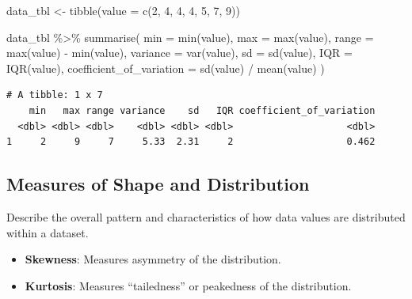 \documentclass[
  man,
  floatsintext,
  longtable,
  nolmodern,
  notxfonts,
  notimes,
  colorlinks=true,linkcolor=blue,citecolor=blue,urlcolor=blue]{apa7}
\newenvironment{Shaded}{\begin{snugshade}}{\end{snugshade}}
\newcommand{\AttributeTok}[1]{\textcolor[rgb]{0.40,0.45,0.13}{#1}}
\newcommand{\DecValTok}[1]{\textcolor[rgb]{0.68,0.00,0.00}{#1}}
\newcommand{\FunctionTok}[1]{\textcolor[rgb]{0.28,0.35,0.67}{#1}}
\newcommand{\NormalTok}[1]{\textcolor[rgb]{0.00,0.23,0.31}{#1}}
\newcommand{\OtherTok}[1]{\textcolor[rgb]{0.00,0.23,0.31}{#1}}
\newcommand{\SpecialCharTok}[1]{\textcolor[rgb]{0.37,0.37,0.37}{#1}}
\providecommand{\tightlist}{%
  \setlength{\itemsep}{0pt}\setlength{\parskip}{0pt}}
\begin{document}
\begin{Shaded}
\begin{Highlighting}[]
\NormalTok{data\_tbl }\OtherTok{\textless{}{-}} \FunctionTok{tibble}\NormalTok{(}\AttributeTok{value =} \FunctionTok{c}\NormalTok{(}\DecValTok{2}\NormalTok{, }\DecValTok{4}\NormalTok{, }\DecValTok{4}\NormalTok{, }\DecValTok{4}\NormalTok{, }\DecValTok{5}\NormalTok{, }\DecValTok{7}\NormalTok{, }\DecValTok{9}\NormalTok{))}

\NormalTok{data\_tbl }\SpecialCharTok{\%\textgreater{}\%}
  \FunctionTok{summarise}\NormalTok{(}
    \AttributeTok{min =} \FunctionTok{min}\NormalTok{(value),}
    \AttributeTok{max =} \FunctionTok{max}\NormalTok{(value),}
    \AttributeTok{range =} \FunctionTok{max}\NormalTok{(value) }\SpecialCharTok{{-}} \FunctionTok{min}\NormalTok{(value),}
    \AttributeTok{variance =} \FunctionTok{var}\NormalTok{(value),}
    \AttributeTok{sd =} \FunctionTok{sd}\NormalTok{(value),}
    \AttributeTok{IQR =} \FunctionTok{IQR}\NormalTok{(value),}
    \AttributeTok{coefficient\_of\_variation =} \FunctionTok{sd}\NormalTok{(value) }\SpecialCharTok{/} \FunctionTok{mean}\NormalTok{(value)}
\NormalTok{  )}
\end{Highlighting}
\end{Shaded}

\begin{verbatim}
# A tibble: 1 x 7
    min   max range variance    sd   IQR coefficient_of_variation
  <dbl> <dbl> <dbl>    <dbl> <dbl> <dbl>                    <dbl>
1     2     9     7     5.33  2.31     2                    0.462
\end{verbatim}

\subsection{Measures of Shape and
Distribution}\label{measures-of-shape-and-distribution}

Describe the overall pattern and characteristics of how data values are
distributed within a dataset.

\begin{itemize}
\tightlist
\item
  \textbf{Skewness}: Measures asymmetry of the distribution.
\item
  \textbf{Kurtosis}: Measures ``tailedness'' or peakedness of the
  distribution.
\end{itemize}
\end{document}
